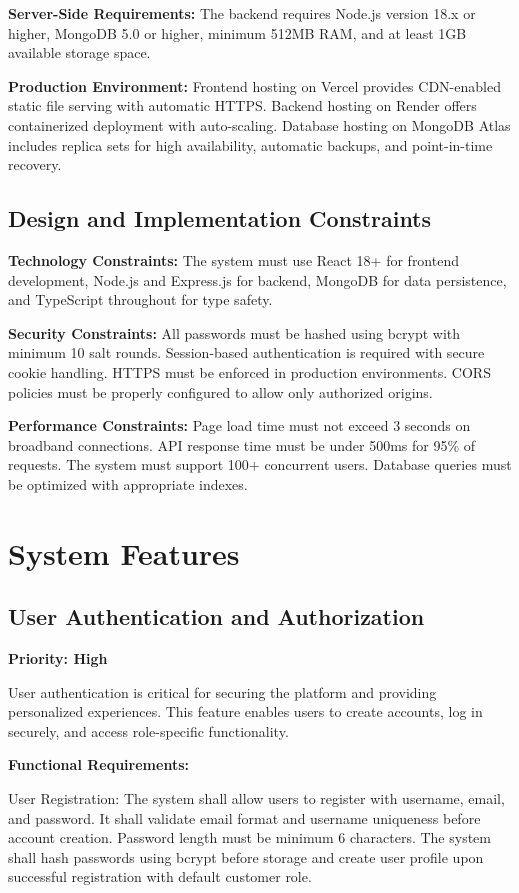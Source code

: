 ﻿\documentclass[11pt]{article}
\begin{document}
\textbf{Server-Side Requirements:} The backend requires Node.js version 18.x or higher, MongoDB 5.0 or higher, minimum 512MB RAM, and at least 1GB available storage space.

\textbf{Production Environment:} Frontend hosting on Vercel provides CDN-enabled static file serving with automatic HTTPS. Backend hosting on Render offers containerized deployment with auto-scaling. Database hosting on MongoDB Atlas includes replica sets for high availability, automatic backups, and point-in-time recovery.

\subsection{Design and Implementation Constraints}
\textbf{Technology Constraints:} The system must use React 18+ for frontend development, Node.js and Express.js for backend, MongoDB for data persistence, and TypeScript throughout for type safety.

\textbf{Security Constraints:} All passwords must be hashed using bcrypt with minimum 10 salt rounds. Session-based authentication is required with secure cookie handling. HTTPS must be enforced in production environments. CORS policies must be properly configured to allow only authorized origins.

\textbf{Performance Constraints:} Page load time must not exceed 3 seconds on broadband connections. API response time must be under 500ms for 95\% of requests. The system must support 100+ concurrent users. Database queries must be optimized with appropriate indexes.

\section{System Features}

\subsection{User Authentication and Authorization}
\textbf{Priority: High}

User authentication is critical for securing the platform and providing personalized experiences. This feature enables users to create accounts, log in securely, and access role-specific functionality.

\textbf{Functional Requirements:}

User Registration: The system shall allow users to register with username, email, and password. It shall validate email format and username uniqueness before account creation. Password length must be minimum 6 characters. The system shall hash passwords using bcrypt before storage and create user profile upon successful registration with default customer role.
\end{document}
